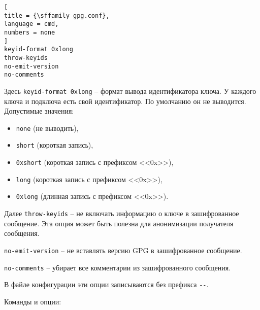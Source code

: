 \documentclass[%
	11pt,
	a4paper,
	utf8,
		]{article}
\begin{document}
\begin{lstlisting}[
title = {\sffamily gpg.conf},
language = cmd,
numbers = none
]
keyid-format 0xlong
throw-keyids
no-emit-version
no-comments
\end{lstlisting}

Здесь \texttt{keyid-format 0xlong} -- формат вывода идентификатора ключа. У каждого ключа и подключа есть свой идентификатор. По умолчанию он не выводится. Допустимые значения:

\begin{itemize}
	\item \texttt{none} (не выводить),
	
	\item \texttt{short} (короткая запись),
	
	\item \texttt{0xshort} (короткая запись с префиксом <<0x>>),
	
	\item \texttt{long} (короткая запись с префиксом <<0x>>),
	
	\item \texttt{0xlong} (длинная запись с префиксом <<0x>>).
\end{itemize}

Далее \texttt{throw-keyids} -- не включать информацию о ключе в зашифрованное сообщение. Эта опция может быть полезна для анонимизации получателя сообщения.

\texttt{no-emit-version} -- не вставлять версию GPG в зашифрованное сообщение.

\texttt{no-comments} -- убирает все комментарии из зашифрованного сообщения.

В файле конфигурации эти опции записываются без префикса \lstinline{--}.

Команды и опции:
\end{document}
